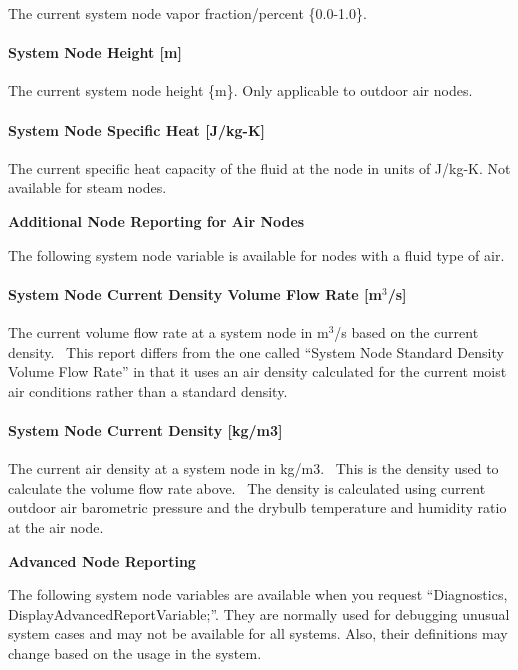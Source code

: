 The current system node vapor fraction/percent \{0.0-1.0\}.

\paragraph{System Node Height {[}m{]}}\label{system-node-height-m}

The current system node height \{m\}. Only applicable to outdoor air nodes.

\paragraph{System Node Specific Heat {[}J/kg-K{]}}\label{system-node-specific-heat-jkg-k}

The current specific heat capacity of the fluid at the node in units of J/kg-K. Not available for steam nodes.

\textbf{Additional Node Reporting for Air Nodes}

The following system node variable is available for nodes with a fluid type of air.

\paragraph{\texorpdfstring{System Node Current Density Volume Flow Rate {[}m\(^{3}\)/s{]}}{System Node Current Density Volume Flow Rate {[}m\^{}\{3\}/s{]}}}\label{system-node-current-density-volume-flow-rate-m3s}

The current volume flow rate at a system node in m\(^{3}\)/s based on the current density.~ This report differs from the one called ``System Node Standard Density Volume Flow Rate'' in that it uses an air density calculated for the current moist air conditions rather than a standard density.

\paragraph{System Node Current Density {[}kg/m3{]}}\label{system-node-current-density-kgm3}

The current air density at a system node in kg/m3.~ This is the density used to calculate the volume flow rate above.~ The density is calculated using current outdoor air barometric pressure and the drybulb temperature and humidity ratio at the air node.

\textbf{Advanced Node Reporting}

The following system node variables are available when you request ``Diagnostics, DisplayAdvancedReportVariable;''. They are normally used for debugging unusual system cases and may not be available for all systems. Also, their definitions may change based on the usage in the system.

